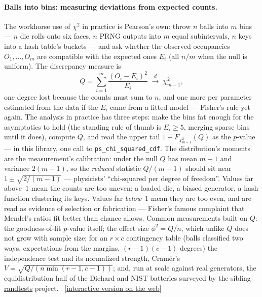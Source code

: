 \documentclass[11pt]{article}
\numberwithin{equation}{section}
\newcommand{\siteurl}{https://sanya-shopper.github.io/distribs/}
\newcommand{\sisterurl}{https://sanya-shopper.github.io/randtests/}
\newcommand{\webfig}[1]{{\small\sffamily\color{inkS}%
  [\href{\siteurl\##1}{interactive version on the web}]}}
\begin{document}
\paragraph{Balls into bins: measuring deviations from expected counts.}
The workhorse use of $\chi^2$ in practice is Pearson's own: throw $n$
balls into $m$ bins --- $n$ die rolls onto six faces, $n$ PRNG outputs
into $m$ equal subintervals, $n$ keys into a hash table's buckets ---
and ask whether the observed occupancies $O_1,\dots,O_m$ are compatible
with the expected ones $E_i$ (all $n/m$ when the null is uniform).  The
discrepancy measure is
\[
Q=\sum_{i=1}^{m}\frac{(O_i-E_i)^2}{E_i}
\;\xrightarrow{\;d\;}\;\chi^2_{m-1},
\]
one degree lost because the counts must sum to $n$, and one more per
parameter estimated from the data if the $E_i$ came from a fitted model
--- Fisher's rule yet again.  The analysis in practice has three steps:
make the bins fat enough for the asymptotics to hold (the standing rule
of thumb is $E_i\ge 5$, merging sparse bins until it does), compute
$Q$, and read the upper tail $1-F_{\chi^2_{m-1}}(Q)$ as the $p$-value
--- in this library, one call to \texttt{ps\_chi\_squared\_cdf}.  The
distribution's moments are the measurement's calibration: under the
null $Q$ has mean $m-1$ and variance $2(m-1)$, so the \emph{reduced}
statistic $Q/(m-1)$ should sit near $1\pm\sqrt{2/(m-1)}$ ---
physicists' ``chi-squared per degree of freedom''.  Values far
above~$1$ mean the counts are too uneven: a loaded die, a biased
generator, a hash function clustering its keys.  Values far
\emph{below}~$1$ mean they are too even, and are read as evidence of
selection or fabrication --- Fisher's famous complaint that Mendel's
ratios fit better than chance allows.  Common measurements built on
$Q$: the goodness-of-fit $p$-value itself; the effect size
$\phi^2=Q/n$, which unlike $Q$ does not grow with sample size; for an
$r\times c$ contingency table (balls classified two ways, expectations
from the margins, $(r-1)(c-1)$ degrees) the independence test and its
normalized strength, Cram\'er's $V=\sqrt{Q/(n\min(r{-}1,c{-}1))}$; and,
run at scale against real generators, the equidistribution half of the
Diehard and NIST batteries surveyed by the sibling
\href{\sisterurl}{randtests} project.\ \webfig{bins}
\end{document}
